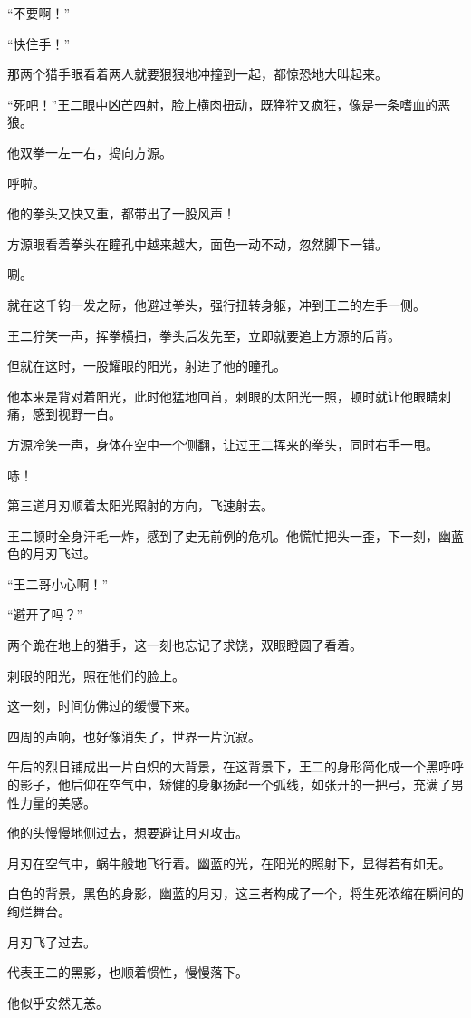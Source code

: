 \begin{this_body}
“不要啊！”

“快住手！”

那两个猎手眼看着两人就要狠狠地冲撞到一起，都惊恐地大叫起来。

“死吧！”王二眼中凶芒四射，脸上横肉扭动，既狰狞又疯狂，像是一条嗜血的恶狼。

他双拳一左一右，捣向方源。

呼啦。

他的拳头又快又重，都带出了一股风声！

方源眼看着拳头在瞳孔中越来越大，面色一动不动，忽然脚下一错。

唰。

就在这千钧一发之际，他避过拳头，强行扭转身躯，冲到王二的左手一侧。

王二狞笑一声，挥拳横扫，拳头后发先至，立即就要追上方源的后背。

但就在这时，一股耀眼的阳光，射进了他的瞳孔。

他本来是背对着阳光，此时他猛地回首，刺眼的太阳光一照，顿时就让他眼睛刺痛，感到视野一白。

方源冷笑一声，身体在空中一个侧翻，让过王二挥来的拳头，同时右手一甩。

哧！

第三道月刃顺着太阳光照射的方向，飞速射去。

王二顿时全身汗毛一炸，感到了史无前例的危机。他慌忙把头一歪，下一刻，幽蓝色的月刃飞过。

“王二哥小心啊！”

“避开了吗？”

两个跪在地上的猎手，这一刻也忘记了求饶，双眼瞪圆了看着。

刺眼的阳光，照在他们的脸上。

这一刻，时间仿佛过的缓慢下来。

四周的声响，也好像消失了，世界一片沉寂。

午后的烈日铺成出一片白炽的大背景，在这背景下，王二的身形简化成一个黑呼呼的影子，他后仰在空气中，矫健的身躯扬起一个弧线，如张开的一把弓，充满了男性力量的美感。

他的头慢慢地侧过去，想要避让月刃攻击。

月刃在空气中，蜗牛般地飞行着。幽蓝的光，在阳光的照射下，显得若有如无。

白色的背景，黑色的身影，幽蓝的月刃，这三者构成了一个，将生死浓缩在瞬间的绚烂舞台。

月刃飞了过去。

代表王二的黑影，也顺着惯性，慢慢落下。

他似乎安然无恙。


\end{this_body}
